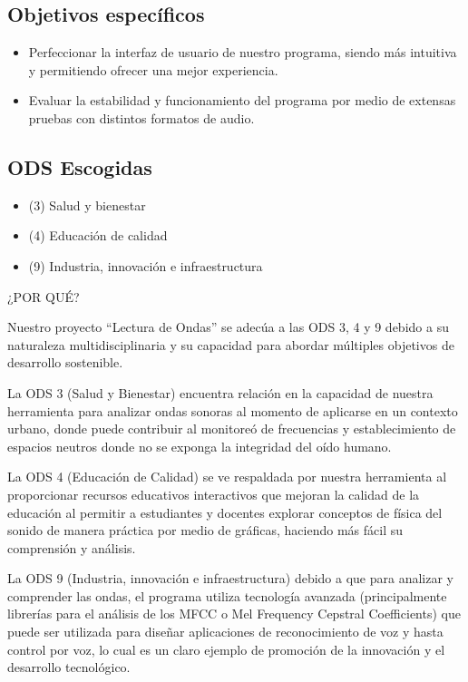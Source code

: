 \documentclass[letterpaper, 12pt]{article}
\begin{document}
\subsection*{Objetivos específicos}

\begin{itemize}[label=$\triangleright$]
	\item Perfeccionar la interfaz de usuario de nuestro programa,
	      siendo más intuitiva y permitiendo ofrecer una mejor
	      experiencia.

	\item Evaluar la estabilidad y funcionamiento del programa por
	      medio de extensas pruebas con distintos formatos de audio.
\end{itemize}

\subsection*{ODS Escogidas}

\begin{itemize}[label=$\triangleright$]
	\item (3) Salud y bienestar
	\item (4) Educación de calidad
	\item (9) Industria, innovación e infraestructura
\end{itemize}

¿POR QUÉ?

Nuestro proyecto ``Lectura de Ondas'' se adecúa a las ODS
3, 4 y 9 debido a su naturaleza multidisciplinaria y su
capacidad para abordar múltiples objetivos de desarrollo
sostenible.

La ODS 3 (Salud y Bienestar) encuentra relación en la
capacidad de nuestra herramienta para analizar ondas
sonoras al momento de aplicarse en un contexto urbano,
donde puede contribuir al monitoreó de frecuencias y
establecimiento de espacios neutros donde no se exponga la
integridad del oído humano.

La ODS 4 (Educación de Calidad) se ve respaldada por
nuestra herramienta al proporcionar recursos educativos
interactivos que mejoran la calidad de la educación al
permitir a estudiantes y docentes explorar conceptos de
física del sonido de manera práctica por medio de gráficas,
haciendo más fácil su comprensión y análisis.

La ODS 9 (Industria, innovación e infraestructura) debido a
que para analizar y comprender las ondas, el programa
utiliza tecnología avanzada (principalmente librerías para
el análisis de los MFCC o Mel Frequency Cepstral
Coefficients) que puede ser utilizada para diseñar
aplicaciones de reconocimiento de voz y hasta control por
voz, lo cual es un claro ejemplo de promoción de la
innovación y el desarrollo tecnológico.
\end{document}

